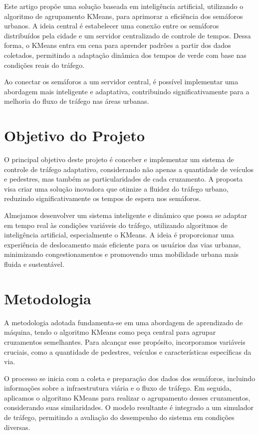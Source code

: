 \documentclass[a4paper, 10pt, conference]{IEEEtran}
\begin{document}
Este artigo propõe uma solução baseada em inteligência artificial, utilizando o algoritmo de agrupamento KMeans, para aprimorar a eficiência dos semáforos urbanos. A ideia central é estabelecer uma conexão entre os semáforos distribuídos pela cidade e um servidor centralizado de controle de tempos. Dessa forma, o KMeans entra em cena para aprender padrões a partir dos dados coletados, permitindo a adaptação dinâmica dos tempos de verde com base nas condições reais do tráfego.

Ao conectar os semáforos a um servidor central, é possível implementar uma abordagem mais inteligente e adaptativa, contribuindo significativamente para a melhoria do fluxo de tráfego nas áreas urbanas.


\section{Objetivo do Projeto}

O principal objetivo deste projeto é conceber e implementar um sistema de controle de tráfego adaptativo, considerando não apenas a quantidade de veículos e pedestres, mas também as particularidades de cada cruzamento. A proposta visa criar uma solução inovadora que otimize a fluidez do tráfego urbano, reduzindo significativamente os tempos de espera nos semáforos.

Almejamos desenvolver um sistema inteligente e dinâmico que possa se adaptar em tempo real às condições variáveis do tráfego, utilizando algoritmos de inteligência artificial, especialmente o KMeans. A ideia é proporcionar uma experiência de deslocamento mais eficiente para os usuários das vias urbanas, minimizando congestionamentos e promovendo uma mobilidade urbana mais fluida e sustentável.


\section{Metodologia}

A metodologia adotada fundamenta-se em uma abordagem de aprendizado de máquina, tendo o algoritmo KMeans como peça central para agrupar cruzamentos semelhantes. Para alcançar esse propósito, incorporamos variáveis cruciais, como a quantidade de pedestres, veículos e características específicas da via.

O processo se inicia com a coleta e preparação dos dados dos semáforos, incluindo informações sobre a infraestrutura viária e o fluxo de tráfego. Em seguida, aplicamos o algoritmo KMeans para realizar o agrupamento desses cruzamentos, considerando suas similaridades. O modelo resultante é integrado a um simulador de tráfego, permitindo a avaliação do desempenho do sistema em condições diversas.
\end{document}
